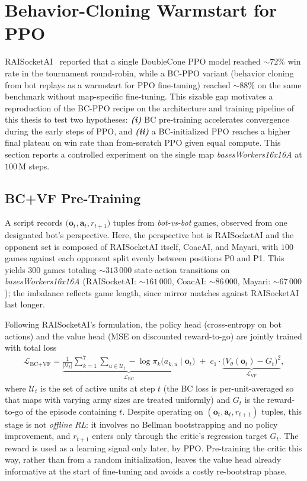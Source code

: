 \section{Behavior-Cloning Warmstart for PPO}
\label{sec:bc-ppo}

RAISocketAI~\cite{goodfriendCompetitionWinningDeep2024} reported that a single DoubleCone PPO model reached ${\sim}72$\% win rate in the tournament round-robin, while a BC-PPO variant (behavior cloning from bot replays as a warmstart for PPO fine-tuning) reached ${\sim}88$\% on the same benchmark without map-specific fine-tuning. This sizable gap motivates a reproduction of the BC-PPO recipe on the architecture and training pipeline of this thesis to test two hypotheses: \textbf{\emph{(i)}} BC pre-training accelerates convergence during the early steps of PPO, and \textbf{\emph{(ii)}} a BC-initialized PPO reaches a higher final plateau on win rate than from-scratch PPO given equal compute. This section reports a controlled experiment on the single map \emph{basesWorkers16x16A} at $100\,\text{M}$ steps.

\subsection{BC+VF Pre-Training}
\label{subsec:bc-ppo-pretraining}

A script records $\bigl(\mathbf{o}_t, \mathbf{a}_t, r_{t+1}\bigr)$ tuples from \emph{bot-vs-bot} games, observed from one designated bot's perspective. Here, the perspective bot is RAISocketAI and the opponent set is composed of RAISocketAI itself, CoacAI, and Mayari, with $100$ games against each opponent split evenly between positions P0 and P1. This yields $300$ games totaling ${\sim}313\,000$ state-action transitions on \emph{basesWorkers16x16A} (RAISocketAI: ${\sim}161\,000$, CoacAI: ${\sim}86\,000$, Mayari: ${\sim}67\,000$); the imbalance reflects game length, since mirror matches against RAISocketAI last longer.

Following RAISocketAI's formulation, the policy head (cross-entropy on bot actions) and the value head (MSE on discounted reward-to-go) are jointly trained with total loss
\begin{align}
\mathcal{L}_{\text{BC+VF}} = \underbrace{\tfrac{1}{|\mathcal{U}_t|}\sum_{k=1}^{7} \sum_{u \in \mathcal{U}_t} -\log \pi_k\bigl(a_{k,u} \mid \mathbf{o}_t\bigr)}_{\mathcal{L}_{\text{BC}}} \;+\; c_1 \cdot \underbrace{\bigl(V_\theta(\mathbf{o}_t) - G_t\bigr)^2}_{\mathcal{L}_{\text{VF}}},
\label{eq:bc-vf-loss}
\end{align}
where $\mathcal{U}_t$ is the set of active units at step $t$ (the BC loss is per-unit-averaged so that maps with varying army sizes are treated uniformly) and $G_t$ is the reward-to-go of the episode containing $t$. Despite operating on $(\mathbf{o}_t, \mathbf{a}_t, r_{t+1})$ tuples, this stage is not \emph{offline RL}: it involves no Bellman bootstrapping and no policy improvement, and $r_{t+1}$ enters only through the critic's regression target $G_t$. The reward is used as a learning signal only later, by PPO. Pre-training the critic this way, rather than from a random initialization, leaves the value head already informative at the start of fine-tuning and avoids a costly re-bootstrap phase.

